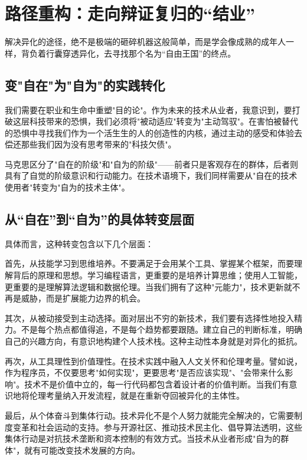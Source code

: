\documentclass[a4paper,12pt]{ctexart}
\begin{document}
\section{路径重构：走向辩证复归的“结业”}

解决异化的途径，绝不是极端的砸碎机器这般简单，而是学会像成熟的成年人一样，背负着行囊穿透异化，去寻找那个名为“自由王国”的终点。


\subsection{变"自在"为"自为"的实践转化}

我们需要在职业和生命中重塑"目的论"。作为未来的技术从业者，我意识到，要打破这层科技带来的恐惧，我们必须将"被动适应"转变为"主动驾驭"。在害怕被替代的恐惧中寻找我们作为一个活生生的人的创造性的内核，通过主动的感受和体验去偿还那些我们因为没有思考带来的"科技欠债"。

马克思区分了"自在的阶级"和"自为的阶级"——前者只是客观存在的群体，后者则具有了自觉的阶级意识和行动能力。在技术语境下，我们同样需要从"自在的技术使用者"转变为"自为的技术主体"。

\subsection{从“自在”到“自为”的具体转变层面}
具体而言，这种转变包含以下几个层面：

首先，从技能学习到思维培养。不要满足于会用某个工具、掌握某个框架，而要理解背后的原理和思想。学习编程语言，更重要的是培养计算思维；使用人工智能，更重要的是理解算法逻辑和数据伦理。当我们拥有了这种"元能力"，技术更新就不再是威胁，而是扩展能力边界的机会。

其次，从被动接受到主动选择。面对层出不穷的新技术，我们要有选择性地投入精力。不是每个热点都值得追，不是每个趋势都要跟随。建立自己的判断标准，明确自己的兴趣方向，有意识地构建个人技术栈。这种主动性本身就是对异化的抵抗。

再次，从工具理性到价值理性。在技术实践中融入人文关怀和伦理考量。譬如说，作为程序员，不仅要思考"如何实现"，更要思考"是否应该实现"、"会带来什么影响"。技术不是价值中立的，每一行代码都包含着设计者的价值判断。当我们有意识地将伦理考量纳入开发流程，就是在重新夺回被异化的主体性。

最后，从个体奋斗到集体行动。技术异化不是个人努力就能完全解决的，它需要制度变革和社会运动的支持。参与开源社区、推动技术民主化、倡导算法透明，这些集体行动是对抗技术垄断和资本控制的有效方式。当技术从业者形成"自为的群体"，就有可能改变技术发展的方向。
\end{document}
